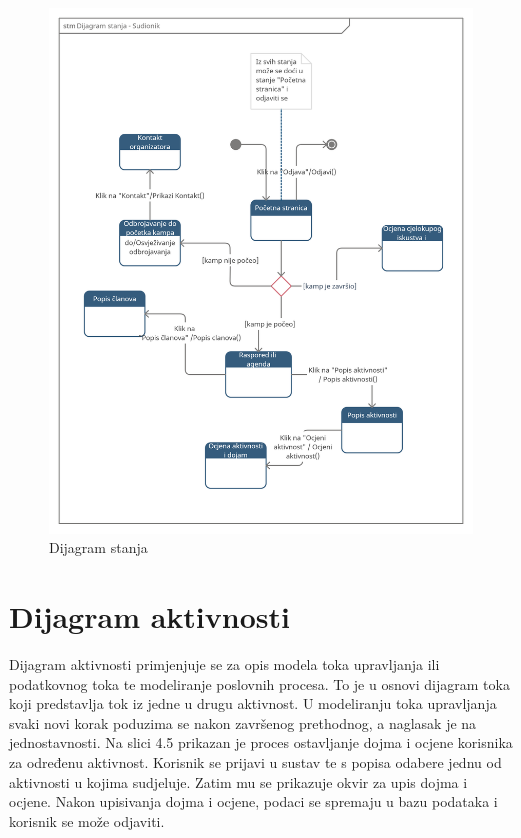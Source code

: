 \begin{figure}[htb]
	\centering
	\includegraphics[scale=0.2]{dijagrami/dijagramStanja.PNG}
	\caption{Dijagram stanja}
	\label{fig: dijagram stanja}
\end{figure}
		\eject
		
		\section{Dijagram aktivnosti}
			
Dijagram aktivnosti primjenjuje se za opis modela toka upravljanja ili podatkovnog toka te modeliranje poslovnih procesa. To je u osnovi dijagram toka koji predstavlja tok iz jedne u drugu aktivnost. U modeliranju toka upravljanja svaki novi korak poduzima se nakon završenog prethodnog, a naglasak je na jednostavnosti.
Na slici 4.5 prikazan je proces ostavljanje dojma i ocjene korisnika za određenu aktivnost. Korisnik se prijavi u sustav te s popisa odabere jednu od aktivnosti u kojima sudjeluje. Zatim mu se prikazuje okvir za upis dojma i ocjene. Nakon upisivanja dojma i ocjene, podaci se spremaju u bazu podataka i korisnik se može odjaviti. \\


